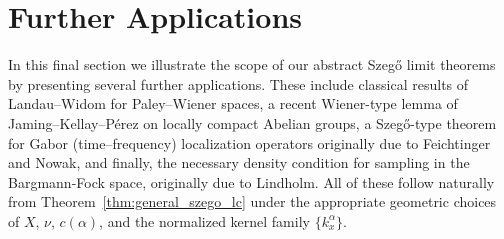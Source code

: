 \documentclass{amsart}
\newtheorem{cor}[thm]{Corollary}
\theoremstyle{definition}
\theoremstyle{remark}
\numberwithin{equation}{section}
\begin{document}





\section{Further Applications}

In this final section we illustrate the scope of our abstract Szeg\H{o} limit theorems by presenting several further applications.  
These include classical results of Landau--Widom for Paley--Wiener spaces, 
a recent Wiener-type lemma of Jaming--Kellay--Pérez on locally compact Abelian groups, 
a Szeg\H{o}-type theorem for Gabor (time--frequency) localization operators originally due to Feichtinger and Nowak, and finally, the necessary density condition for sampling in the Bargmann-Fock space, originally due to Lindholm.  
All of these follow naturally from Theorem~\ref{thm:general_szego_lc} under the appropriate geometric choices of $X$, $\nu$, $c(\alpha)$, and the normalized kernel family $\{k^\alpha_x\}$.
\end{document}
